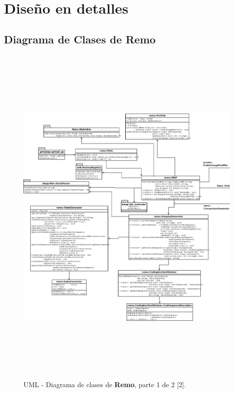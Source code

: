 \chapter{Diseño en detalles}
\label{disenioEnDetalles}

\section{Diagrama de Clases de Remo}
\begin{figure}[!hbtp]
	\begin{center}
		\hspace*{-1.5cm}\includegraphics[width=20cm, height=17.5cm, angle=90]{image/remo1.png}
		\caption{UML - Diagrama de clases de \textbf{Remo}, parte 1 de 2 [2].}
		\label{remoDClase1}
	\end{center}
\end{figure}

